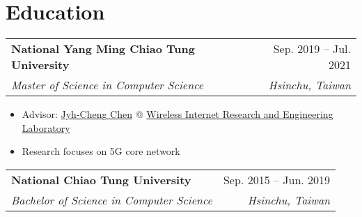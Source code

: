 \documentclass[letterpaper,11pt]{article}
\makeatletter
\newcommand{\resumeItemTwo}[1]{
  \item\small{
    {#1 \vspace{-2pt}}
  }
}
\newcommand{\resumeSubheading}[4]{
  \vspace{1pt}%
    \begin{tabular*}{0.97\textwidth}{l@{\extracolsep{\fill}}r}
      \textbf{#1} & #2 \\
      \textit{\small#3} & \textit{\small #4} \\
    \end{tabular*}\vspace{-5pt}
}
\newcommand{\resumeSubHeadingListStart}{}%
\newcommand{\resumeSubHeadingListEnd}{}%
\newcommand{\resumeItemListStart}{\begin{itemize}}
\newcommand{\resumeItemListEnd}{\end{itemize}\vspace{-5pt}}
\makeatother
\begin{document}
\section{Education}
  \resumeSubHeadingListStart
    \resumeSubheading
      {National Yang Ming Chiao Tung University}{Sep. 2019 -- Jul. 2021}
      {Master of Science in Computer Science}{Hsinchu, Taiwan}
      \resumeItemListStart
        \resumeItemTwo{Advisor: \href{https://people.cs.nctu.edu.tw/~jcc/}{Jyh-Cheng Chen} @ \href{http://wire.cs.nctu.edu.tw/}{Wireless Internet Research and Engineering Laboratory}}
        \resumeItemTwo{Research focuses on 5G core network}
      \resumeItemListEnd
    \resumeSubheading
      {National Chiao Tung University}{Sep. 2015 -- Jun. 2019}
      {Bachelor of Science in Computer Science}{Hsinchu, Taiwan}
  \resumeSubHeadingListEnd
  
\end{document}

